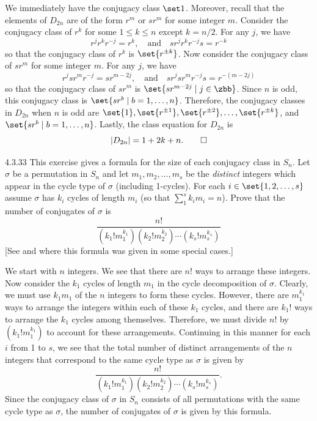 \begin{sol}
	We immediately have the conjugacy class $\set 1$.
	Moreover, recall that the elements of $D_{2n}$ are of the form $r^m$ or $sr^m$ for some integer $m$.
	Consider the conjugacy class of $r^k$ for some $1 \leq k \leq n$ except $k = n/2$.
	For any $j$, we have
	\[
		r^jr^kr^{-j} = r^k, \quad \text{and} \quad sr^jr^kr^{-j}s = r^{-k}
	\]
	so that the conjugacy class of $r^k$ is $\set{r^{\pm k}}$.
	Now consider the conjugacy class of $sr^m$ for some integer $m$.
	For any $j$, we have
	\[
		r^jsr^mr^{-j} = sr^{m - 2j}, \quad \text{and} \quad sr^jsr^mr^{-j}s = r^{-(m - 2j)}
	\]
	so that the conjugacy class of $sr^m$ is $\set{sr^{m - 2j} \mid j \in \zbb}$.
	Since $n$ is odd, this conjugacy class is $\set{sr^b \mid b = 1, \ldots, n}$.
	Therefore, the conjugacy classes in $D_{2n}$ when $n$ is odd are $\set{1}, \set{r^{\pm 1}}, \set{r^{\pm 2}}, \ldots, \set{r^{\pm k}}$, and $\set{sr^b \mid b = 1, \ldots, n}$.
	Lastly, the class equation for $D_{2n}$ is
	\[
		|D_{2n}| = 1 + 2k + n.\qedhere
	\]
\end{sol}

\begin{spex}{4.3.33}
	This exercise gives a formula for the size of each conjugacy class in $S_n$.
	Let $\sigma$ be a permutation in $S_n$ and let $m_1, m_2, \ldots, m_s$ be the \emph{distinct} integers which appear in the cycle type of $\sigma$ (including 1-cycles).
	For each $i \in \set{1, 2, \ldots, s}$ assume $\sigma$ has $k_i$ cycles of length $m_i$ (so that $\sum_1^s k_im_i = n$).
	Prove that the number of conjugates of $\sigma$ is
	\[
		\frac{n!}{(k_1!m_1^{k_1})(k_2!m_2^{k_2}) \cdots (k_s!m_s^{k_s})}
	\]
	[See  and  where this formula was given in some special cases.]
\end{spex}

\begin{sol}[spsol]
	We start with $n$ integers.
	We see that there are $n!$ ways to arrange these integers.
	Now consider the $k_1$ cycles of length $m_1$ in the cycle decomposition of $\sigma$.
	Clearly, we must use $k_1m_1$ of the $n$ integers to form these cycles.
	However, there are $m_1^{k_1}$ ways to arrange the integers within each of these $k_1$ cycles, and there are $k_1!$ ways to arrange the $k_1$ cycles among themselves.
	Therefore, we must divide $n!$ by $(k_1!m_1^{k_1})$ to account for these arrangements.
	Continuing in this manner for each $i$ from 1 to $s$, we see that the total number of distinct arrangements of the $n$ integers that correspond to the same cycle type as $\sigma$ is given by
	\[
		\frac{n!}{(k_1!m_1^{k_1})(k_2!m_2^{k_2}) \cdots (k_s!m_s^{k_s})}.
	\]
	Since the conjugacy class of $\sigma$ in $S_n$ consists of all permutations with the same cycle type as $\sigma$, the number of conjugates of $\sigma$ is given by this formula.
\end{sol}

